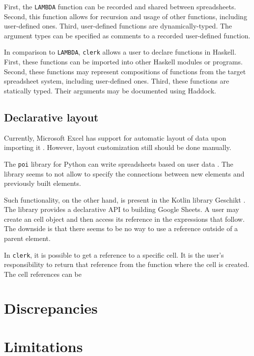 First, the \texttt{LAMBDA} function can be recorded and shared between spreadsheets.
Second, this function allows for recursion and usage of other functions, including user-defined ones.
Third, user-defined functions are dynamically-typed.
The argument types can be specified as comments to a recorded user-defined function.

In comparison to \texttt{LAMBDA}, \texttt{clerk} allows a user to declare functions in Haskell.
First, these functions can be imported into other Haskell modules or programs.
Second, these functions may represent compositions of functions from the target spreadsheet system, including user-defined ones.
Third, these functions are statically typed. Their arguments may be documented using Haddock.

\subsection{Declarative layout}

Currently, Microsoft Excel has support for automatic layout of data upon importing it \cite{excel_custom_types}.
However, layout customization still should be done manually.

The \texttt{poi} library for Python can write spreadsheets based on user data \cite{wang_poi_nodate}.
The library seems to not allow to specify the connections between new elements and previously built elements.

Such functionality, on the other hand, is present in the Kotlin library Geschikt \cite{noauthor_sikrinickgeshikt_nodate}.
The library provides a declarative API to building Google Sheets.
A user may create an cell object and then access its reference in the expressions that follow.
The downside is that there seems to be no way to use a reference outside of a parent element.

In \texttt{clerk}, it is possible to get a reference to a specific cell.
It is the user's responsibility to return that reference from the function where the cell is created.
The cell references can be

\section{Discrepancies}
\label{eval:discrepancies}

\section{Limitations}
\label{eval:limitations}

